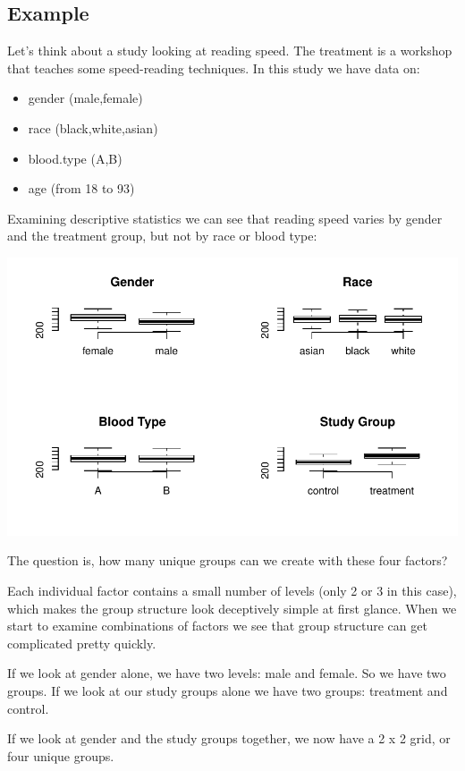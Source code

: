 \documentclass[]{book}
\providecommand{\tightlist}{%
  \setlength{\itemsep}{0pt}\setlength{\parskip}{0pt}}
\theoremstyle{definition}
\theoremstyle{definition}
\theoremstyle{definition}
\theoremstyle{remark}
\begin{document}
\hypertarget{example}{%
\subsection{Example}\label{example}}

Let's think about a study looking at reading speed. The treatment is a
workshop that teaches some speed-reading techniques. In this study we
have data on:

\begin{itemize}
\tightlist
\item
  gender (male,female)
\item
  race (black,white,asian)
\item
  blood.type (A,B)
\item
  age (from 18 to 93)
\end{itemize}

Examining descriptive statistics we can see that reading speed varies by
gender and the treatment group, but not by race or blood type:

\begin{center}\includegraphics[width=0.7\linewidth]{DS4PS-I_files/figure-latex/unnamed-chunk-137-1} \end{center}

The question is, how many unique groups can we create with these four
factors?

Each individual factor contains a small number of levels (only 2 or 3 in
this case), which makes the group structure look deceptively simple at
first glance. When we start to examine combinations of factors we see
that group structure can get complicated pretty quickly.

If we look at gender alone, we have two levels: male and female. So we
have two groups. If we look at our study groups alone we have two
groups: treatment and control.

If we look at gender and the study groups together, we now have a 2 x 2
grid, or four unique groups.
\end{document}
